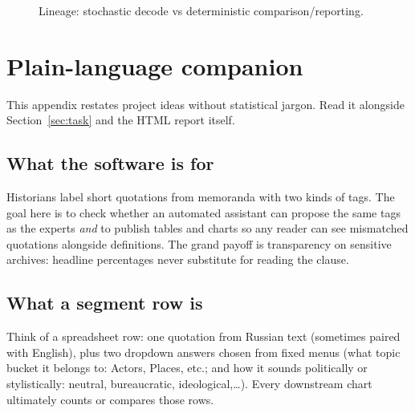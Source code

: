 \documentclass[11pt,a4paper]{article}
\theoremstyle{remark}
\begin{document}
\begin{figure}[htbp]
\centering
{}
\caption{Lineage: stochastic decode vs deterministic comparison/reporting.}
\label{fig:lineage}
\end{figure}

\section{Plain-language companion}
\label{app:plain}

This appendix restates project ideas without statistical jargon. Read it alongside Section~\ref{sec:task} and the HTML report itself.

\subsection{What the software is for}
Historians label short quotations from memoranda with two kinds of tags. The goal here is to check whether an automated assistant can propose the same tags as the experts \emph{and} to publish tables and charts so any reader can see mismatched quotations alongside definitions. The grand payoff is transparency on sensitive archives: headline percentages never substitute for reading the clause.

\subsection{What a segment row is}
Think of a spreadsheet row: one quotation from Russian text (sometimes paired with English), plus two dropdown answers chosen from fixed menus (what topic bucket it belongs to: Actors, Places, etc.; and how it sounds politically or stylistically: neutral, bureaucratic, ideological,\ldots). Every downstream chart ultimately counts or compares those rows.
\end{document}
